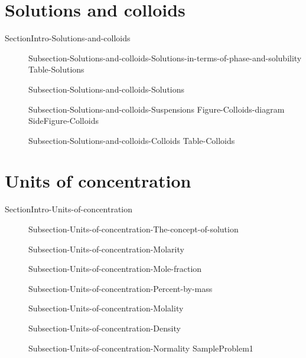 \documentclass[main.tex]{subfiles}
\begin{document}
\section{Solutions and colloids}{SectionIntro-Solutions-and-colloids}
\sloppy \begin{description}
\item[] {Subsection-Solutions-and-colloids-Solutions-in-terms-of-phase-and-solubility}
{Table-Solutions}
\item[] {Subsection-Solutions-and-colloids-Solutions}
\item[] {Subsection-Solutions-and-colloids-Suspensions}
{Figure-Colloids-diagram}   
{SideFigure-Colloids}
\item[] {Subsection-Solutions-and-colloids-Colloids}
{Table-Colloids}
\end{description}


\section{Units of concentration}{SectionIntro-Units-of-concentration}
\sloppy \begin{description}
\item[] {Subsection-Units-of-concentration-The-concept-of-solution}
\item[] {Subsection-Units-of-concentration-Molarity}
\item[] {Subsection-Units-of-concentration-Mole-fraction}
\item[] {Subsection-Units-of-concentration-Percent-by-mass}
\item[] {Subsection-Units-of-concentration-Molality}
\item[] {Subsection-Units-of-concentration-Density}
\item[] {Subsection-Units-of-concentration-Normality}
{SampleProblem1}
\end{description}
\end{document}
